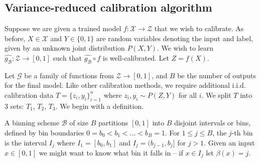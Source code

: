 
\subsection{Variance-reduced calibration algorithm}

Suppose we are given a trained model $f: \mathcal{X} \to \mathcal{Z}$ that we wish to calibrate. As before, $X \in \mathcal{X}$ and $Y \in \{0, 1\}$ are random variables denoting the input and label, given by an unknown joint distribution $P(X, Y)$. We wish to learn $\hat{g_{\mathcal{B}}} : \mathcal{Z} \to [0, 1]$ such that $\hat{g_{\mathcal{B}}} \circ f$ is well-calibrated. Let $Z = f(X)$.

Let $\mathcal{G}$ be a family of functions from $\mathcal{Z} \to [0, 1]$, and $B$ be the number of outputs for the final model. Like other calibration methods, we require additional i.i.d. calibration data $T = \{ z_i, y_i \}_{i=1}^n$ where $z_i, y_i \sim P(Z, Y)$ for all $i$. We split $T$ into 3 sets: $T_1$, $T_2$, $T_3$. We begin with a definition.

\begin{definition}
A binning scheme $\mathcal{B}$ of size $B$ partitions $[0, 1]$ into $B$ disjoint intervals or bins, defined by bin boundaries $0 = b_0 < b_1 < ... < b_B = 1$. For $1 \leq j \leq B$, the $j$-th bin is the interval $I_j$ where $I_1 = [b_0, b_1]$ and $I_j = (b_{j-1}, b_j]$ for $j > 1$. Given an input $x \in [0, 1]$ we might want to know what bin it falls in -- if $x \in I_j$ let $\beta(x) = j$.
\end{definition}


